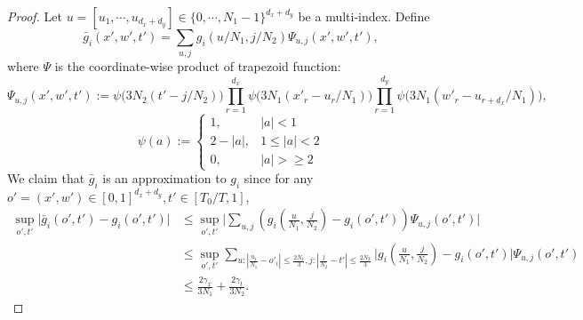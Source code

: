 \documentclass{article}
\numberwithin{equation}{section}
\theoremstyle{definition}
\begin{document}
\begin{proof}
    Let $u=[u_1,\cdots,u_{d_x+d_y}]\in\{0,\cdots,N_1-1\}^{d_x+d_y}$ be a multi-index. Define
    \begin{equation}\label{eq:def_g_bar}
        \bar{g}_i(x',w',t')=\sum_{u,j}g_i(u/N_1,j/N_2)\Psi_{u,j}(x',w',t'),
    \end{equation}
    where $\Psi$ is the coordinate-wise product of trapezoid function:
    \begin{equation}
        \Psi_{u,j}(x',w',t'):=\psi\big(3N_2(t'-j/N_2)\big)\prod_{r=1}^{d_x}\psi\big(3N_1(x'_r-u_r/N_1)\big)\prod_{r=1}^{d_y}\psi\big(3N_1(w'_r-u_{r+d_x}/N_1)\big),
    \end{equation}
    \begin{equation}
        \psi(a):=\left\{
            \begin{array}{ll}
                1, & |a|< 1 \\
                2-|a|, & 1\leq |a| < 2 \\
                0, & |a|>\geq 2
            \end{array}
        \right.
    \end{equation}
    We claim that $\bar{g}_i$ is an approximation to $g_i$ since for any $o'=(x',w')\in[0,1]^{d_x+d_y},t'\in[T_0/T,1]$,
    \begin{equation}
        \begin{aligned}
            \sup_{o',t'}\Big|\bar{g}_i(o',t')-g_i(o',t')|
            &\leq \sup_{o',t'}\Big|\sum_{u,j}(g_i(\frac{u}{N_1},\frac{j}{N_2})-g_i(o',t'))\Psi_{u,j}(o',t')\Big| \\
            &\leq \sup_{o',t'} \sum_{u:|\frac{u_i}{N_1}-o'_i|\leq \frac{2N_1}{3},j:|\frac{j}{N_2}-t'|\leq \frac{2N_2}{3}}\Big|g_i(\frac{u}{N_1},\frac{j}{N_2})-g_i(o',t')\Big|\Psi_{u,j}(o',t') \\
            &\leq \frac{2\gamma_x}{3N_1}+\frac{2\gamma_t}{3N_2}.
        \end{aligned}
    \end{equation}
    

\end{proof}
\end{document}
